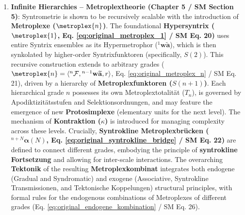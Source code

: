 \documentclass[
    12pt,              %
    a4paper,           %
    headings=normal,   %
    twoside=true,      %
    BCOR=8mm,          %
]{scrbook}
\newcommand{\hypersyntrix}{\metroplex{1}}
\newcommand{\hypermetrophor}[1]{{}^{#1}\mathbf{w\widetilde{a}}}
\newcommand{\metroplexsynkolator}[1]{{}^{#1}\mathcal{F}}
\newcommand{\metroplextotalitaet}[1]{T_{#1}}
\newcommand{\syntroklinebruecke}[1]{{}^{#1}\bm{\alpha}}
\newcommand{\metroplexfunktor}{S}
\begin{document}
\begin{enumerate}
    \item \textbf{Infinite Hierarchies – Metroplextheorie (Chapter 5 / SM Section 5)}: Syntrometrie is shown to be recursively scalable with the introduction of \textbf{Metroplexe (\( \metroplex{n} \))}. The foundational \textbf{Hypersyntrix (\( \hypersyntrix \), Eq. \eqref{eq:original_metroplex_1} / SM Eq. 20)} uses entire Syntrix ensembles as its Hypermetrophor (\( \hypermetrophor{1} \)), which is then synkolated by higher-order Syntrixfunktoren (specifically, \( \metroplexfunktor(2) \)). This recursive construction extends to arbitrary grades (\( \metroplex{n} = \langle \metroplexsynkolator{n}, \hypermetrophor{n-1}, r \rangle \), Eq. \eqref{eq:original_metroplex_n} / SM Eq. 21), driven by a hierarchy of \textbf{Metroplexfunktoren (\( \metroplexfunktor(n+1) \))}. Each hierarchical grade \(n\) possesses its own Metroplextotalität (\( \metroplextotalitaet{n} \)), is governed by Apodiktizitätsstufen and Selektionsordnungen, and may feature the emergence of new \textbf{Protosimplexe} (elementary units for the next level). The mechanism of \textbf{Kontraktion (\( \kappa \))} is introduced for managing complexity across these levels. Crucially, \textbf{Syntrokline Metroplexbrücken (\( \syntroklinebruecke{n+N}(N) \), Eq. \eqref{eq:original_syntrokline_bridge} / SM Eq. 22)} are defined to connect different grades, embodying the principle of \textbf{syntrokline Fortsetzung} and allowing for inter-scale interactions. The overarching \textbf{Tektonik} of the resulting \textbf{Metroplexkombinat} integrates both endogene (Gradual and Syndromatic) and exogene (Associative, Syntrokline Transmissionen, and Tektonische Koppelungen) structural principles, with formal rules for the endogenous combinations of Metroplexes of different grades (Eq. \eqref{eq:original_endogene_kombination} / SM Eq. 26).


\end{enumerate}
\end{document}
